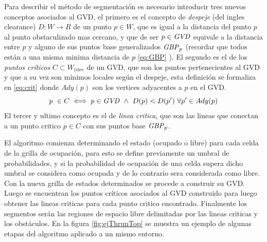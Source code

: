 Para describir el método de segmentación es necesario introducir tres nuevos conceptos asociados al GVD, el primero es el concepto de \emph{despeje} (del ingles clearance) $D : W \rightarrow R$ de un punto $p \in W$, que es igual a la distancia del punto $p$ al punto obstaculizado mas cercano, y que de ser $p \in \mathit{GVD}$ equivale a la distancia entre $p$ y alguno de sus puntos base generalizados $\mathit{GBP}_p$ (recordar que todos están a una misma minima distancia de $p$ \eqref{eq:GBP} ). El segundo es el de los \emph{puntos críticos} $C \subset W_{libre}$ de un GVD, que son los puntos pertenecientes al GVD y que a su vez son mínimos locales según el despeje, esta definición se formaliza en \eqref{eq:crit} donde $Ady(p)$ son los vertices adyacentes a $p$ en el GVD. 
\begin{equation}
  p\ \in C \iff p \in \mli{GVD}\ \land \ D(p) < D(p')\ \forall p' \in Ady(p) \label{eq:crit}
\end{equation}
El tercer y ultimo concepto es el de \emph{linea critica}, que son las lineas que conectan a un punto critico $p \in C$ con sus puntos base $\mathit{GBP}_p$.

El algoritmo comienza determinando el estado (ocupado o libre) para cada celda de la grilla de ocupación, para esto se define previamente un umbral de probabilidades, y si la probabilidad de ocupación de una celda supera dicho umbral se considera como ocupada y de lo contrario sera considerada como libre. Con la nueva grilla de estados determinados se procede a construir su  GVD. Luego se encuentran los puntos críticos asociados al GVD construido para luego obtener las lineas criticas para cada punto critico encontrado. Finalmente los segmentos serán las regiones de espacio libre delimitadas por las lineas criticas y los obstáculos. En la figura \ref{fig:ejThrunTop} se muestra un ejemplo de algunas etapas del algoritmo aplicado a un mismo entorno.

